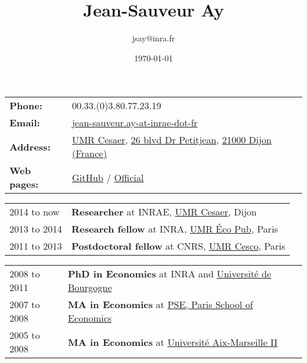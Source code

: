 \documentclass[11pt, a4paper]{./style}
\author{jsay@inra.fr}
\date{\today}
\title{Jean-Sauveur Ay}
\begin{document}
\maketitle


\label{sec:org3683507}

\begin{center}
\begin{tabular}{ll}
\textbf{Phone:} & 00.33.(0)3.80.77.23.19\\
\textbf{Email:} & \href{mailto:jean-sauveur.ay@inrae.fr}{jean-sauveur.ay-at-inrae-dot-fr}\\
\textbf{Address:} & \href{https://www2.dijon.inrae.fr/cesaer/en/axis/}{UMR Cesaer}, \href{https://www.google.com/maps/?q\%3D47.3097819,5.0644835}{26 blvd Dr Petitjean}, \href{https://www.google.com/maps/place/21000+Dijon/}{21000 Dijon (France)}\\
\textbf{Web pages:} & \href{http://github.com/jsay/}{GitHub} / \href{https://www2.dijon.inrae.fr/cesaer/membres/jean-sauveur-ay/}{Official}\\
\end{tabular}
\end{center}

\label{sec:org9ac2d7d}

\begin{center}
\begin{tabular}{ll}
2014 to now & \textbf{Researcher} at INRAE, \href{https://www2.dijon.inrae.fr/cesaer/en/axis/}{UMR Cesaer}, Dijon\\
2013 to 2014 & \textbf{Research fellow} at INRA, \href{https://www6.versailles-grignon.inrae.fr/economie\_publique\_eng/}{UMR Éco Pub}, Paris\\
2011 to 2013 & \textbf{Postdoctoral fellow} at CNRS, \href{http://cesco.mnhn.fr/en}{UMR Cesco}, Paris\\
\end{tabular}
\end{center}

\label{sec:orgd95debc}

\begin{center}
\begin{tabular}{ll}
2008 to 2011 & \textbf{PhD in Economics} at INRA and \href{http://en.u-bourgogne.fr/}{Université de Bourgogne}\\
2007 to 2008 & \textbf{MA in Economics} at \href{https://www.parisschoolofeconomics.eu/en/}{PSE, Paris School of Economics}\\
2005 to 2008 & \textbf{MA in Economics} at \href{https://www.amse-aixmarseille.fr/en}{Université Aix-Marseille II}\\
\end{tabular}
\end{center}
\end{document}
